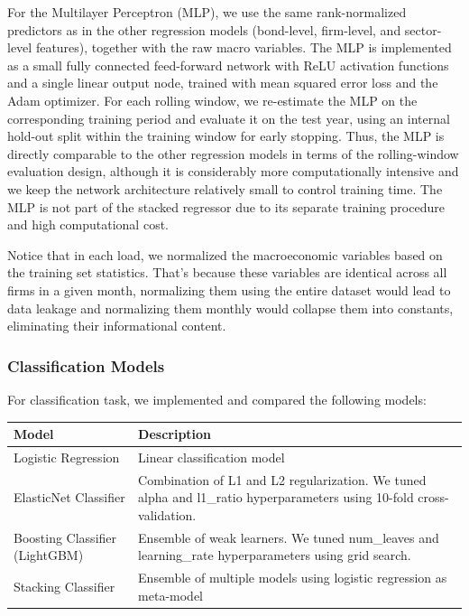 \documentclass[12pt]{article}
\begin{document}
For the Multilayer Perceptron (MLP), we use the same rank-normalized predictors as in the other regression models (bond-level, firm-level, and sector-level features), together with the raw macro variables. The MLP is implemented as a small fully connected feed-forward network with ReLU activation functions and a single linear output node, trained with mean squared error loss and the Adam optimizer. For each rolling window, we re-estimate the MLP on the corresponding training period and evaluate it on the test year, using an internal hold-out split within the training window for early stopping. Thus, the MLP is directly comparable to the other regression models in terms of the rolling-window evaluation design, although it is considerably more computationally intensive and we keep the network architecture relatively small to control training time. The MLP is not part of the stacked regressor due to its separate training procedure and high computational cost.

Notice that in each load, we normalized the macroeconomic variables based on the training set statistics. That's because these variables are identical across all firms in a given month, normalizing them using the entire dataset would lead to data leakage and normalizing them monthly would collapse them into constants, eliminating their informational content.

\subsubsection{Classification Models}

For classification task, we implemented and compared the following models:

\begin{singlespace}
\begin{table}[H]
\centering
\begin{tabular}{ll}
\toprule
\textbf{Model} & \textbf{Description} \\
\midrule
Logistic Regression & Linear classification model \\
ElasticNet Classifier & Combination of L1 and L2 regularization. We tuned alpha and l1\_ratio hyperparameters using 10-fold cross-validation. \\
Boosting Classifier (LightGBM) & Ensemble of weak learners. We tuned num\_leaves and learning\_rate hyperparameters using grid search. \\
Stacking Classifier & Ensemble of multiple models using logistic regression as meta-model \\
\bottomrule
\end{tabular}
\end{table}
\end{singlespace}
\end{document}
